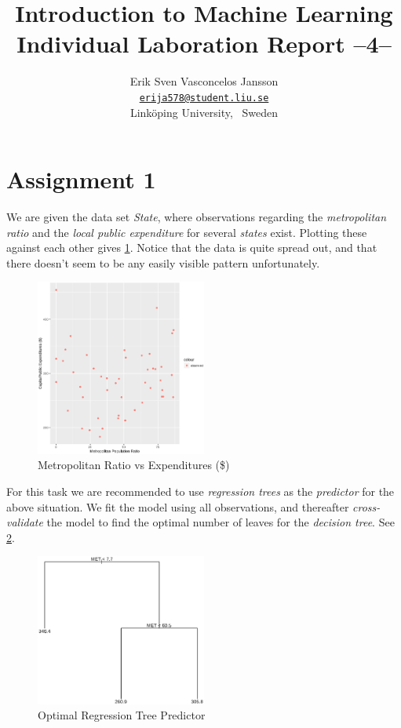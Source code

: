 \documentclass[a4paper, twocolumn]{article}
\title{Introduction to Machine Learning \\
       Individual Laboration Report --4--}
\author{{Erik Sven Vasconcelos Jansson} \\
        {\href{mailto:erija578@student.liu.se}
        {\texttt{erija578@student.liu.se}}} \\
        {Linköping University, \, Sweden}}
\begin{document}
    \maketitle %

    \section*{Assignment 1}

        We are given the data set \emph{State}, where observations regarding the \emph{metropolitan ratio} and the \emph{local public expenditure} for several \emph{states} exist. Plotting these against each other gives \cref{fig:state}. Notice that the data is quite spread out, and that there doesn't seem to be any easily visible pattern unfortunately.

        \begin{figure}[h!]
            \centering
            \caption{Metropolitan Ratio vs Expenditures (\$)}
            \label{fig:state}
            \includegraphics[width=0.5\textwidth]{share/state.eps}
        \end{figure}

        For this task we are recommended to use \emph{regression trees} as the \emph{predictor} for the above situation. We fit the model using all observations, and thereafter \emph{cross-validate} the model to find the optimal number of leaves for the \emph{decision tree}. See \cref{fig:tree}.

        \begin{figure}[h!]
            \centering
            \caption{Optimal Regression Tree Predictor}
            \label{fig:tree}
            \includegraphics[width=0.5\textwidth]{share/tree.eps}
        \end{figure}
\end{document}
